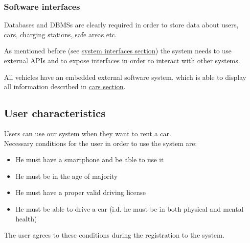 \subsubsection{Software interfaces}
Databases and DBMSs are clearly required in order to store data about users, cars, charging stations, safe areas etc.

As mentioned before (see \hyperref[sec:systemInterfaces]{system interfaces section}) the system needs to use external APIs and to expose interfaces in order to interact with other systems.

All vehicles have an embedded external software system, which is able to display all information described in \hyperref[sec:cars]{cars section}.

\subsection{User characteristics}
	Users can use our system when they want to rent a car.\\
	Necessary conditions for the user in order to use the system are:
	\begin{itemize}
		\item He must have a smartphone and be able to use it
		\item He must be in the age of majority
		\item He must have a proper valid driving license
		\item He must be able to drive a car (i.d. he must be in both physical and mental health)
	\end{itemize}
	The user agrees to these conditions during the registration to the system.

